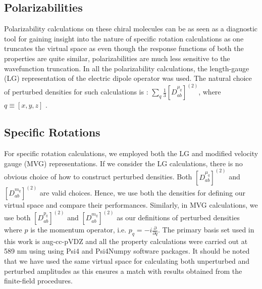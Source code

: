 \subsection{Polarizabilities}
Polarizability calculations on these chiral molecules can be as seen as a diagnostic 
tool for gaining insight into the nature of specific rotation calculations as one 
truncates the virtual space as even though the response functions of 
both the properties are quite similar, polarizabilities are much less sensitive to the 
wavefunction truncation. In all the polarizability calculations, the length-gauge 
(LG) representation of the electric dipole operator was used. The natural choice of 
perturbed densities for such calculations is : $\sum\limits_q \frac{1}{3}[{D^{\mu_q}_{ab}}]^{(2)}$,
where $q \equiv [x,y,z]$ . 
\subsection{Specific Rotations}
For specific rotation calculations, we employed both the LG and modified velocity gauge (MVG)\cite{Pedersen04} 
representations. If we consider the LG calculations, there is no obvious
choice of how to construct perturbed densities. Both $[{D^{\mu_q}_{ab}}]^{(2)}$ 
and $[{D^{m_q}_{ab}}]^{(2)}$ are valid choices. Hence, we use both the densities
for defining our virtual space and compare their performances.
Similarly, in MVG calculations, we use both $[{D^{p_q}_{ab}}]^{(2)}$ 
and $[{D^{m_q}_{ab}}]^{(2)}$ as our definitions of 
perturbed densities where $p$ is the momentum operator, i.e. 
$p_q = -i\frac{\partial}{\partial{q}}$. 
The primary basis set used in this work is aug-cc-pVDZ\cite{Dunning89,Kendall92,Woon94}
and all the property calculations were carried out at 589 nm using 
using Psi4 and Psi4Numpy software packages.\cite{Parrish17, Smith18}
It should be noted that we have used the same virtual space for calculating both unperturbed 
and perturbed amplitudes as this ensures a match with results obtained from 
the finite-field procedures. 
